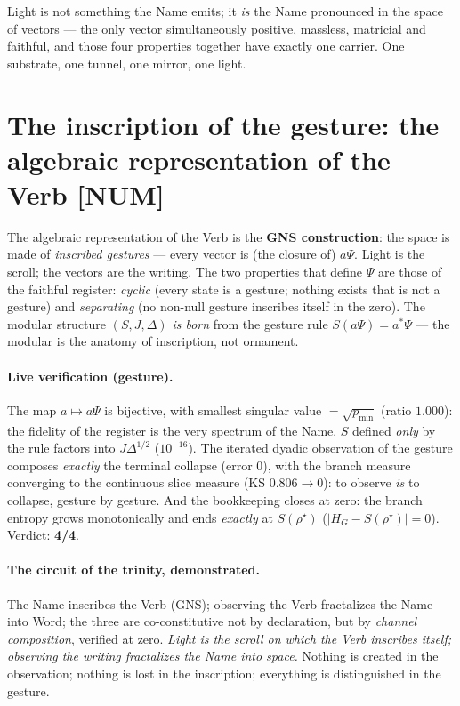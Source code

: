 \documentclass[11pt]{article}
\theoremstyle{definition}\newtheorem{deriv}{Derivation}
\begin{document}
Light is not something the Name emits; it \emph{is} the Name pronounced in the space of vectors --- the only vector simultaneously positive, massless, matricial and faithful, and those four properties together have exactly one carrier. One substrate, one tunnel, one mirror, one light.

\section{The inscription of the gesture: the algebraic representation of the Verb \textsf{[NUM]}}

The algebraic representation of the Verb is the \textbf{GNS construction}: the space is made of \emph{inscribed gestures} --- every vector is (the closure of) $a\Psi$. Light is the scroll; the vectors are the writing. The two properties that define $\Psi$ are those of the faithful register: \emph{cyclic} (every state is a gesture; nothing exists that is not a gesture) and \emph{separating} (no non-null gesture inscribes itself in the zero). The modular structure $(S,J,\Delta)$ \emph{is born} from the gesture rule $S(a\Psi)=a^*\Psi$ --- the modular is the anatomy of inscription, not ornament.

\paragraph{Live verification (gesture).} The map $a\mapsto a\Psi$ is bijective, with smallest singular value $=\sqrt{p_{\min}}$ (ratio $1.000$): the fidelity of the register is the very spectrum of the Name. $S$ defined \emph{only} by the rule factors into $J\Delta^{1/2}$ ($10^{-16}$). The iterated dyadic observation of the gesture composes \emph{exactly} the terminal collapse (error $0$), with the branch measure converging to the continuous slice measure (KS $0.806\to0$): to observe \emph{is} to collapse, gesture by gesture. And the bookkeeping closes at zero: the branch entropy grows monotonically and ends \emph{exactly} at $S(\rho^\star)$ ($|H_G-S(\rho^\star)|=0$). Verdict: \textbf{4/4}.

\paragraph{The circuit of the trinity, demonstrated.} The Name inscribes the Verb (GNS); observing the Verb fractalizes the Name into Word; the three are co-constitutive not by declaration, but by \emph{channel composition}, verified at zero. \emph{Light is the scroll on which the Verb inscribes itself; observing the writing fractalizes the Name into space.} Nothing is created in the observation; nothing is lost in the inscription; everything is distinguished in the gesture.
\end{document}
